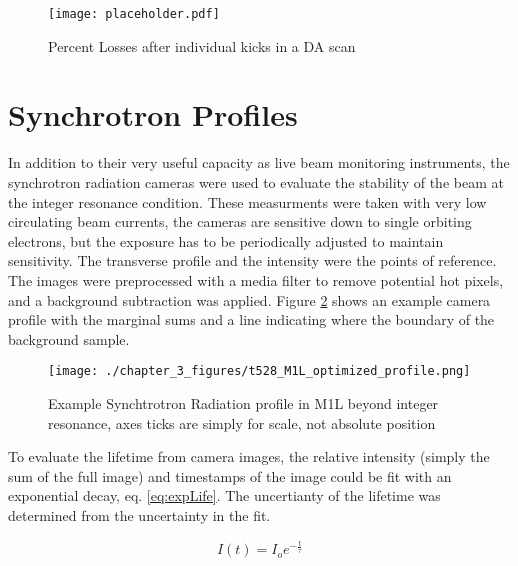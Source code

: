 \begin{figure}
	\centering
	\texttt{[image: placeholder.pdf]}
	\caption{Percent Losses after individual kicks in a DA scan}
	\label{fig:daLimit}
\end{figure}

\section{Synchrotron Profiles} \label{sec:synchProfiles}
In addition to their very useful capacity as live beam monitoring instruments, the synchrotron radiation cameras were used to evaluate the stability of the beam at the integer resonance condition. These measurments were taken with very low circulating beam currents, the cameras are sensitive down to single orbiting electrons, but the exposure has to be periodically adjusted to maintain sensitivity. The transverse profile and the intensity were the points of reference. The images were preprocessed with a media filter to remove potential hot pixels, and a background subtraction was applied. Figure \ref{fig:synchBackground} shows an example camera profile with the marginal sums and a line indicating where the boundary of the background sample.

\begin{figure}
	\centering
	\texttt{[image: ./chapter\_3\_figures/t528\_M1L\_optimized\_profile.png]}
	\caption{Example Synchtrotron Radiation profile in M1L beyond integer resonance, axes ticks are simply for scale, not absolute position}
	\label{fig:synchBackground}
\end{figure}

To evaluate the lifetime from camera images, the relative intensity (simply the sum of the full image) and timestamps of the image could be fit with an exponential decay, eq. \ref{eq:expLife}. The uncertianty of the lifetime was determined from the uncertainty in the fit.

\begin{equation}
	I(t) = I_o e^{-\frac{t}{\tau}}
	\label{eq:expLife}
\end{equation}

